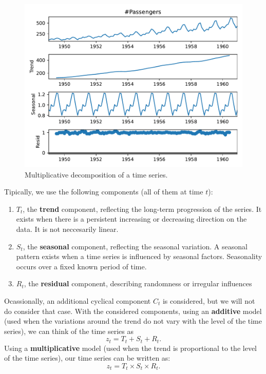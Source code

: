 \begin{figure}[H]
\centering
\includegraphics[scale=0.7]{Figures/Decomp}
\caption{Multiplicative decomposition of a time series.}
\end{figure}



Tipically, we use the following components (all of them at time \(t\)):

\begin{enumerate}
\item \(T_t\), the \textbf{trend} component, reflecting the long-term progression of the series. It exists when there is a persistent increasing or decreasing direction on the data. It is not neccesarily linear.

\item \(S_t\), the \textbf{seasonal} component, reflecting the seasonal variation. A seasonal pattern exists when a time series is influenced by seasonal factors. Seasonality occurs over a fixed known period of time.

\item \(R_t\), the \textbf{residual} component, describing randomness or irregular influences
\end{enumerate}

Ocassionally, an additional cyclical component \(C_t\) is considered, but we will not do consider that case. With the considered components, using an \textbf{additive} model (used when the variations around the trend do not vary with the level of the time series), we can think of the time series as 
\[
z_t = T_t + S_t + R_t.
\]
Using a \textbf{multiplicative} model (used when the trend is proportional to the level of the time series), our time series can be written as:
\[
z_t = T_t \times S_t \times R_t. 
\]

